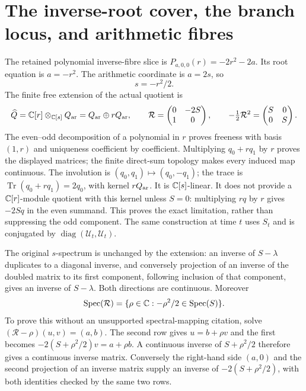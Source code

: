 \section{The inverse-root cover, the branch locus, and arithmetic fibres}
\label{sec:cq-cover}
The retained polynomial inverse-fibre slice is
$P_{a,0,0}(r)=-2r^2-2a$. Its root equation is $a=-r^2$.
The arithmetic coordinate is $a=2s$, so
\begin{equation}\label{eq:cq-cover}
 s=-r^2/2.
\end{equation}
The finite free extension of the actual quotient is
\[
 \widehat Q=\mathbb C[r]\otimes_{\mathbb C[s]}Q_{\rm ar}
           =Q_{\rm ar}\oplus rQ_{\rm ar},
 \qquad
 \mathcal R=\begin{pmatrix}0&-2S\\1&0\end{pmatrix},
 \qquad -\tfrac12\mathcal R^2=\begin{pmatrix}S&0\\0&S\end{pmatrix}.
\]
The even--odd decomposition of a polynomial in $r$ proves freeness
with basis $(1,r)$ and uniqueness coefficient by coefficient.
Multiplying $q_0+rq_1$ by $r$ proves the displayed matrices;
the finite direct-sum topology makes every induced map continuous.
The involution is $(q_0,q_1)\mapsto(q_0,-q_1)$; the trace is
$\operatorname{Tr}(q_0+rq_1)=2q_0$, with kernel $rQ_{\rm ar}$.
It is $\mathbb C[s]$-linear. It does not provide a $\mathbb C[r]$-module
quotient with this kernel unless $S=0$: multiplying $rq$ by $r$
gives $-2Sq$ in the even summand. This proves the exact limitation,
rather than suppressing the odd component. The same construction
at time $t$ uses $S_t$ and is conjugated by
$\operatorname{diag}(\mathcal U_t,\mathcal U_t)$.

The original $s$-spectrum is unchanged by the extension: an inverse
of $S-\lambda$ duplicates to a diagonal inverse, and conversely
projection of an inverse of the doubled matrix to its first component,
following inclusion of that component, gives an inverse of
$S-\lambda$. Both directions are continuous. Moreover
\begin{equation}\label{eq:cq-rspec}
 \operatorname{Spec}(\mathcal R)
 =\{\rho\in\mathbb C:-\rho^2/2\in\operatorname{Spec}(S)\}.
\end{equation}
To prove this without an unsupported spectral-mapping citation,
solve $(\mathcal R-\rho)(u,v)=(a,b)$. The second row gives
$u=b+\rho v$ and the first becomes
$-2(S+\rho^2/2)v=a+\rho b$. A continuous inverse of
$S+\rho^2/2$ therefore gives a continuous inverse matrix.
Conversely the right-hand side $(a,0)$ and the second projection
of an inverse matrix supply an inverse of $-2(S+\rho^2/2)$,
with both identities checked by the same two rows.

